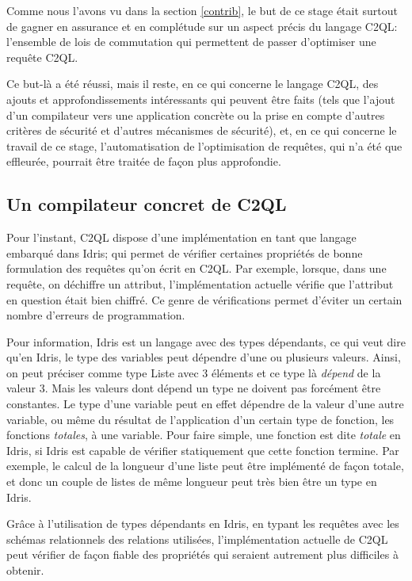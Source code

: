 Comme nous l'avons vu dans la section
\ref{contrib}, le but de ce stage 
était surtout de gagner en assurance et en
\og complétude \fg{} sur un aspect précis
du langage C2QL: l'ensemble de lois
de commutation qui permettent de passer d'optimiser une
requête C2QL.

Ce but-là a été réussi, mais il reste, en ce qui
concerne le langage C2QL, des ajouts et
approfondissements intéressants qui peuvent être faits
(tels que l'ajout d'un compilateur vers une application
concrète ou la prise en compte d'autres critères de
sécurité et d'autres mécanismes de sécurité), et,
en ce qui concerne le travail de ce stage, 
l'automatisation de l'optimisation de requêtes,
qui n'a été que effleurée, pourrait être traitée
de façon plus approfondie.

\subsection*{Un compilateur concret de C2QL}
Pour l'instant, C2QL dispose d'une implémentation
en tant que langage embarqué dans Idris; qui permet
de vérifier certaines propriétés de \og bonne formulation
\fg{} des requêtes qu'on écrit en C2QL. Par exemple,
lorsque, dans une requête, on déchiffre
un attribut, l'implémentation actuelle
vérifie que l'attribut en question était bien chiffré.
Ce genre de vérifications permet d'éviter un certain
nombre d'erreurs de programmation.

Pour information, Idris est un langage avec des types
dépendants, ce qui veut dire qu'en Idris, le type
des variables peut dépendre d'une ou plusieurs valeurs.
Ainsi, on peut préciser comme type 
\og Liste avec 3 éléments \fg{} et ce type là
\emph{dépend} de la valeur 3.
Mais les valeurs dont dépend un type ne doivent pas
forcément être constantes. Le type d'une variable peut
en effet dépendre de la valeur d'une autre variable,
ou même du résultat de l'application d'un certain type
de fonction, les fonctions \emph{totales}, à une variable.
Pour faire simple, une fonction est dite \emph{totale}
en Idris, si Idris est capable de vérifier statiquement
que cette fonction termine.
Par exemple, le calcul de la longueur d'une liste peut
être implémenté de façon totale, et donc
\og un couple de listes de même longueur \fg{}
peut très bien être un type en Idris.

Grâce à l'utilisation de types dépendants en Idris,
en typant les requêtes avec les schémas relationnels
des relations utilisées,
l'implémentation actuelle de C2QL peut vérifier
de façon fiable des propriétés qui seraient autrement
plus difficiles à obtenir.

